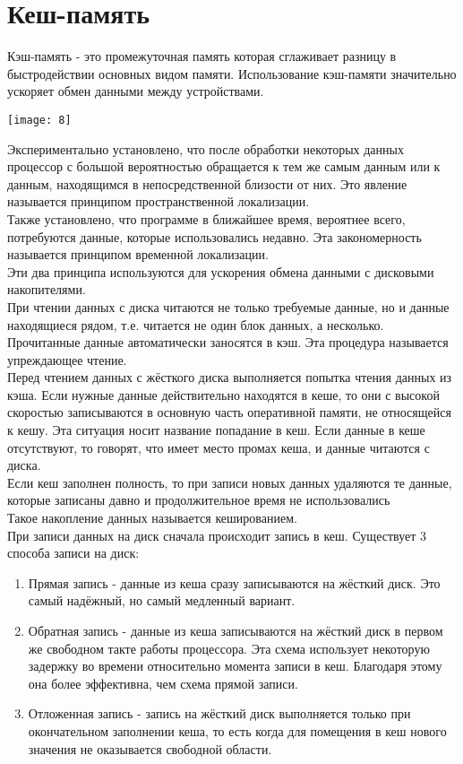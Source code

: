 \documentclass[a4paper]{article}
\begin{document}
\section*{Кеш-память}
\setcounter{subsection}{0}
Кэш-память - это промежуточная память которая сглаживает разницу в быстродействии основных видом памяти. Использование кэш-памяти значительно ускоряет обмен данными между устройствами.\\
\begin{center}
	\texttt{[image: 8]}
\end{center}
Экспериментально установлено, что после обработки некоторых данных процессор с большой вероятностью обращается к тем же самым данным или к данным, находящимся в непосредственной близости от них. Это явление называется принципом пространственной локализации.\\
Также установлено, что программе в ближайшее время, вероятнее всего, потребуются данные, которые использовались недавно. Эта закономерность называется принципом временной локализации.\\
Эти два принципа используются для ускорения обмена данными с дисковыми накопителями.\\
При чтении данных с диска читаются не только требуемые данные, но и данные находящиеся рядом, т.е. читается не один блок данных, а несколько. Прочитанные данные автоматически заносятся в кэш. Эта процедура называется упреждающее чтение.\\
Перед чтением данных с жёсткого диска выполняется попытка чтения данных из кэша. Если нужные данные действительно находятся в кеше, то они с высокой скоростью записываются в основную часть оперативной памяти, не относящейся к кешу. Эта ситуация носит название попадание в кеш. Если данные в кеше отсутствуют, то говорят, что имеет место промах кеша, и данные читаются с диска.\\
Если кеш заполнен полность, то при записи новых данных удаляются те данные, которые записаны давно и продолжительное время не использовались\\
Такое накопление данных называется кешированием.\\
При записи данных на диск сначала происходит запись в кеш. Существует 3 способа записи на диск:\\
\begin{enumerate}
        
	\item Прямая запись - данные из кеша сразу записываются на жёсткий диск. Это самый надёжный, но самый медленный вариант.\\
\item Обратная запись - данные из кеша записываются на жёсткий диск в первом же свободном такте работы процессора. Эта схема использует некоторую задержку во времени относительно момента записи в кеш. Благодаря этому она более эффективна, чем схема прямой записи.\\
\item Отложенная запись - запись на жёсткий диск выполняется только при окончательном заполнении кеша, то есть когда для помещения в кеш нового значения не оказывается свободной области.\\
\end{enumerate}
\end{document}
